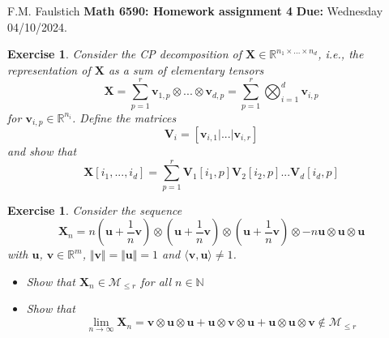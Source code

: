 \documentclass[11pt]{article}
\newcommand{\bvec}[1]{\mathbf{#1}}
\newcommand{\vu}{\bvec{u}}
\newcommand{\vv}{\bvec{v}}
\newcommand{\vV}{\bvec{V}}
\newcommand{\vX}{\bvec{X}}
\newtheorem{exercise}[theorem]{Exercise}
\begin{document}
\begin{flushleft}
F.M. Faulstich \hfill {\large\bf Math 6590: Homework assignment 4} \hfill {\bf Due:} Wednesday 04/10/2024.\\
\end{flushleft}


\begin{exercise}
Consider the CP decomposition of $\vX \in \mathbb{R}^{n_1 \times ... \times n_d}$, i.e., the representation of $\vX$ as a sum of elementary tensors
$$
\vX
=
\sum_{p=1}^r
\vv_{1,p} \otimes ... \otimes \vv_{d,p}
=
\sum_{p=1}^r \bigotimes_{i=1}^d \vv_{i,p}
$$
for $\vv_{i,p} \in \mathbb{R}^{n_i}$. Define the matrices
\begin{equation}
\vV_i 
=
[
\vv_{i,1}|...|\vv_{i,r}
]
\end{equation}
and show that 
\begin{equation}
\vX [i_1,...,i_d]
=
\sum_{p=1}^r
\vV_1[i_1,p] \vV_2[i_2,p] ... \vV_d[i_d,p]
\end{equation}

\end{exercise}


\begin{exercise}
Consider the sequence
$$
\vX_n
=n
\left(
\vu + \frac{1}{n} \vv
\right)
\otimes 
\left(
\vu + \frac{1}{n} \vv
\right)
\otimes 
\left(
\vu + \frac{1}{n} \vv
\right)
\otimes 
-
n \vu \otimes \vu \otimes \vu 
$$
with $\vu$, $\vv \in\mathbb{R}^m$, $\Vert \vv \Vert = \Vert \vu \Vert =1$ and $\langle \vv, \vu \rangle \neq 1$.\\
\begin{itemize}
\item[i)] Show that 
 $\vX_n \in \mathcal{M}_{\leq r}$ for all $n\in\mathbb{N}$
\item[ii)] Show that 
$$
\lim_{n\to \infty} \vX_n 
=
\vv \otimes \vu \otimes \vu +
\vu \otimes \vv \otimes \vu +
\vu \otimes \vu \otimes \vv
\notin \mathcal{M}_{\leq r}
$$
\end{itemize}
\end{exercise}
\end{document}
